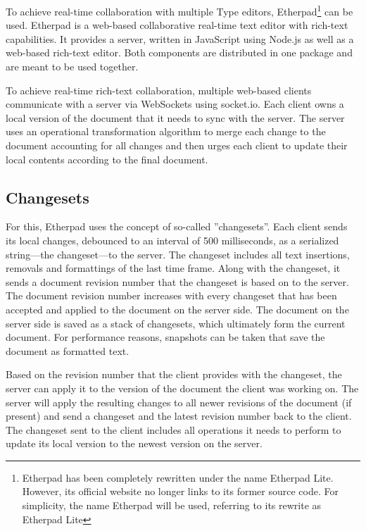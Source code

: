 To achieve real-time collaboration with multiple Type editors, Etherpad\footnote{Etherpad has been completely rewritten under the name Etherpad Lite. However, its official website no longer links to its former source code. For simplicity, the name Etherpad will be used, referring to its rewrite as Etherpad Lite} can be used. Etherpad is a web-based collaborative real-time text editor with rich-text capabilities. It provides a server, written in JavaScript using Node.js as well as a web-based rich-text editor. Both components are distributed in one package and are meant to be used together.

To achieve real-time rich-text collaboration, multiple web-based clients communicate with a server via WebSockets using socket.io. Each client owns a local version of the document that it needs to sync with the server. The server uses an operational transformation algorithm to merge each change to the document accounting for all changes and then urges each client to update their local contents according to the final document.

\subsection{Changesets}

For this, Etherpad uses the concept of so-called ''changesets''. Each client sends its local changes, debounced to an interval of 500 milliseconds, as a serialized string---the changeset---to the server. The changeset includes all text insertions, removals and formattings of the last time frame. Along with the changeset, it sends a document revision number that the changeset is based on to the server. The document revision number increases with every changeset that has been accepted and applied to the document on the server side. The document on the server side is saved as a stack of changesets, which ultimately form the current document. For performance reasons, snapshots can be taken that save the document as formatted text. 

Based on the revision number that the client provides with the changeset, the server can apply it to the version of the document the client was working on. The server will apply the resulting changes to all newer revisions of the document (if present) and send a changeset and the latest revision number back to the client. The changeset sent to the client includes all operations it needs to perform to update its local version to the newest version on the server.

